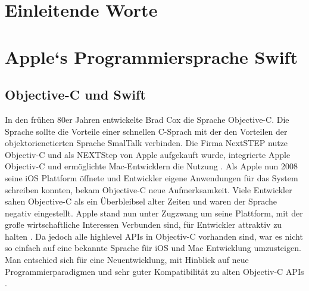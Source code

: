 

\section{Einleitende Worte}

\section{Apple`s Programmiersprache Swift}
\subsection{Objective-C und Swift}
In den frühen 80er Jahren entwickelte Brad Cox die Sprache Objective-C. Die Sprache sollte die Vorteile einer schnellen C-Sprach mit der den Vorteilen der objektorienetierten Sprache SmalTalk verbinden. Die Firma NextSTEP nutze Objectiv-C und als NEXTStep von Apple aufgekauft wurde, integrierte Apple Objectiv-C und ermöglichte Mac-Entwicklern die Nutzung \cite{Dalrymple:2009aa}. Als Apple nun 2008 seine iOS Plattform öffnete und Entwickler eigene Anwendungen für das System schreiben konnten, bekam Objective-C neue Aufmerksamkeit. Viele Entwickler sahen Objective-C als ein Überbleibsel alter Zeiten und waren der Sprache negativ eingestellt. Apple stand nun unter Zugzwang um seine Plattform, mit der große wirtschaftliche Interessen Verbunden sind, für Entwickler attraktiv zu halten \cite{tre}. Da jedoch alle highlevel APIs in Objectiv-C vorhanden sind, war es nicht so einfach auf eine bekannte Sprache für iOS und Mac Entwicklung umzusteigen. Man entschied sich für eine Neuentwicklung, mit Hinblick auf neue Programmierparadigmen und sehr guter Kompatibilität zu alten Objectiv-C APIs \cite{tre}.



